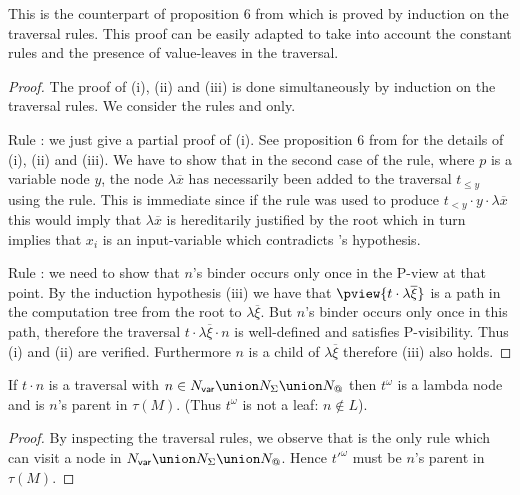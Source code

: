 This is the counterpart of proposition 6 from
\cite{OngHoMchecking2006} which is proved by induction on the
traversal rules. This proof can be easily adapted to take into
account the constant rules and the presence of value-leaves in the
traversal.
\begin{proof}
The proof of (i), (ii) and (iii) is done simultaneously by induction on the traversal rules. We consider the rules  and  only.

Rule : we just give a partial proof of (i). See proposition 6 from \cite{OngHoMchecking2006} for the details of (i), (ii) and (iii). We have to show that in the second case of the  rule, where $p$ is a variable node $y$, the node $\lambda \overline{x}$ has necessarily been added to the traversal $t_{\leq y}$ using the  rule. This is immediate since if the rule  was used to produce $t_{<y} \cdot y \cdot \lambda \overline{x}$ this would imply that $\lambda \overline{x}$ is hereditarily justified by the root which in turn implies that $x_i$ is an input-variable which contradicts 's hypothesis.

Rule : we need to show that $n$'s binder occurs only once in the P-view at that point. By the induction hypothesis (iii) we have that $\pview{t \cdot \lambda \overline{\xi}}$ is a path in the computation tree from the root to $\lambda \overline{\xi}$. But $n$'s binder occurs only once in this path, therefore the traversal $t \cdot \lambda \overline{\xi} \cdot n$ is well-defined and satisfies P-visibility. Thus (i) and (ii) are verified. Furthermore $n$ is a child of $\lambda \overline{\xi}$ therefore (iii) also holds.
\end{proof}



\begin{lemma}
\label{lem:trav_last_not_leaf} If $t \cdot n $ is a traversal with
$n \in N_{\sf var} \union N_\Sigma \union N_@$ then $t^\omega$ is a
lambda node and is $n$'s parent in $\tau(M)$. (Thus $t^\omega$ is
not a leaf: $n\not\in L$).
\end{lemma}
\begin{proof}
By inspecting the traversal rules, we observe that 
is the only rule  which can visit a node in $N_{\sf var} \union
N_\Sigma \union N_@$. Hence $t'^\omega$ must be $n$'s parent in
$\tau(M)$.
\end{proof}



